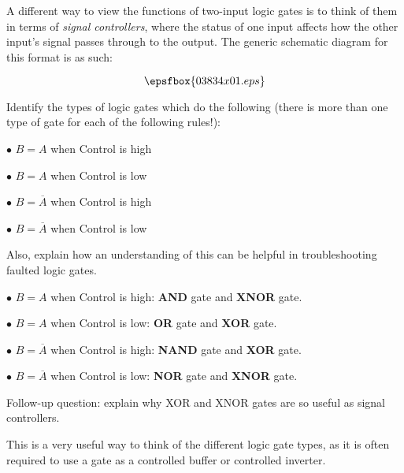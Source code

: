

A different way to view the functions of two-input logic gates is to think of them in terms of {\it signal controllers}, where the status of one input affects how the other input's signal passes through to the output.  The generic schematic diagram for this format is as such:

$$\epsfbox{03834x01.eps}$$

Identify the types of logic gates which do the following (there is more than one type of gate for each of the following rules!):

\medskip
\item{$\bullet$} $B = A$ when Control is high
\item{$\bullet$} $B = A$ when Control is low
\item{$\bullet$} $B = \overline{A}$ when Control is high
\item{$\bullet$} $B = \overline{A}$ when Control is low
\medskip

Also, explain how an understanding of this can be helpful in troubleshooting faulted logic gates.







\medskip
\item{$\bullet$} $B = A$ when Control is high: {\bf AND} gate and {\bf XNOR} gate.
\item{$\bullet$} $B = A$ when Control is low: {\bf OR} gate and {\bf XOR} gate.
\item{$\bullet$} $B = \overline{A}$ when Control is high: {\bf NAND} gate and {\bf XOR} gate.
\item{$\bullet$} $B = \overline{A}$ when Control is low: {\bf NOR} gate and {\bf XNOR} gate.
\medskip

\vskip 10pt

Follow-up question: explain why XOR and XNOR gates are so useful as signal controllers.







This is a very useful way to think of the different logic gate types, as it is often required to use a gate as a controlled buffer or controlled inverter.




